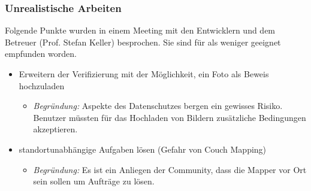 \subsubsection{Unrealistische Arbeiten}
Folgende Punkte wurden in einem Meeting mit den Entwicklern und dem Betreuer (Prof. Stefan Keller) besprochen. 
Sie sind für \kort{} als weniger geeignet empfunden worden.

\begin{itemize}
	\item Erweitern der Verifizierung mit der Möglichkeit, ein Foto als Beweis hochzuladen
	\begin{itemize}
	  \item \emph{Begründung:} Aspekte des Datenschutzes bergen ein gewisses Risiko. Benutzer müssten für das Hochladen von Bildern zusätzliche Bedingungen akzeptieren.
	\end{itemize}
	\item standortunabhängige Aufgaben lösen (Gefahr von Couch Mapping)
	\begin{itemize}
	  \item \emph{Begründung:} Es ist ein Anliegen der  Community, dass die Mapper vor Ort sein sollen um Aufträge zu lösen. 
	\end{itemize}
\end{itemize}
